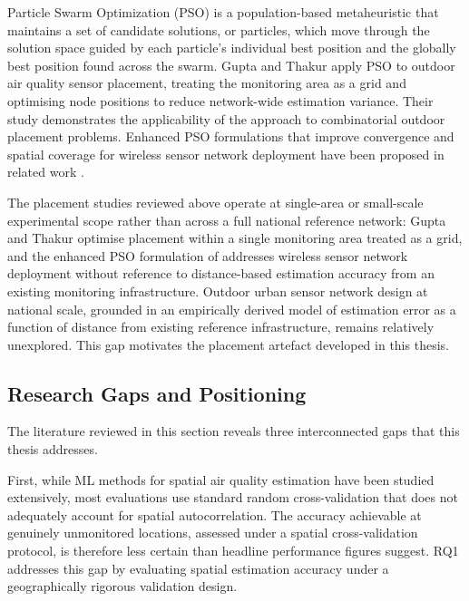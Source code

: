 \documentclass[11pt,a4paper]{article}
\let\oldsubsection\subsection
\renewcommand{\subsection}{\FloatBarrier\oldsubsection}
\begin{document}
Particle Swarm Optimization (PSO) is a population-based metaheuristic that maintains a set of candidate solutions, or particles, which move through the solution space guided by each particle's individual best position and the globally best position found across the swarm. Gupta and Thakur \cite{gupta_pso_placement_2023} apply PSO to outdoor air quality sensor placement, treating the monitoring area as a grid and optimising node positions to reduce network-wide estimation variance. Their study demonstrates the applicability of the approach to combinatorial outdoor placement problems. Enhanced PSO formulations that improve convergence and spatial coverage for wireless sensor network deployment have been proposed in related work \cite{pso_node_deployment_2024}.

The placement studies reviewed above operate at single-area or small-scale experimental scope rather than across a full national reference network: Gupta and Thakur \cite{gupta_pso_placement_2023} optimise placement within a single monitoring area treated as a grid, and the enhanced PSO formulation of \cite{pso_node_deployment_2024} addresses wireless sensor network deployment without reference to distance-based estimation accuracy from an existing monitoring infrastructure. Outdoor urban sensor network design at national scale, grounded in an empirically derived model of estimation error as a function of distance from existing reference infrastructure, remains relatively unexplored. This gap motivates the placement artefact developed in this thesis.

\subsection{Research Gaps and Positioning}
\label{sec:gaps}

The literature reviewed in this section reveals three interconnected gaps that this thesis addresses.

First, while ML methods for spatial air quality estimation have been studied extensively, most evaluations use standard random cross-validation that does not adequately account for spatial autocorrelation. The accuracy achievable at genuinely unmonitored locations, assessed under a spatial cross-validation protocol, is therefore less certain than headline performance figures suggest. RQ1 addresses this gap by evaluating spatial estimation accuracy under a geographically rigorous validation design.
\end{document}
